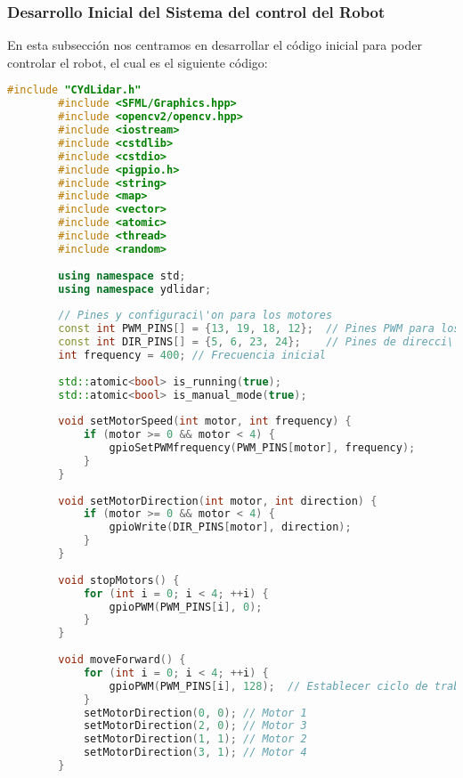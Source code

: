 \subsubsection{Desarrollo Inicial del Sistema del control del Robot}
\label{sub:Desarrollo Inicial del Sistema del control del Robot}
    En esta subsecci\'on nos centramos en desarrollar el c\'odigo inicial para poder controlar el robot, el cual es el siguiente c\'odigo:
    \vskip 0.5cm
    \begin{lstlisting}[language={C++}, caption={Primera versi\'on del c\'odigo del sistema de control del robot}, label={Script}]
        #include "CYdLidar.h"
        #include <SFML/Graphics.hpp>
        #include <opencv2/opencv.hpp>
        #include <iostream>
        #include <cstdlib>
        #include <cstdio>
        #include <pigpio.h>
        #include <string>
        #include <map>
        #include <vector>
        #include <atomic>
        #include <thread>
        #include <random>
        
        using namespace std;
        using namespace ydlidar;
        
        // Pines y configuraci\'on para los motores
        const int PWM_PINS[] = {13, 19, 18, 12};  // Pines PWM para los motores
        const int DIR_PINS[] = {5, 6, 23, 24};    // Pines de direcci\'on para los motores
        int frequency = 400; // Frecuencia inicial
        
        std::atomic<bool> is_running(true);
        std::atomic<bool> is_manual_mode(true);
        
        void setMotorSpeed(int motor, int frequency) {
            if (motor >= 0 && motor < 4) {
                gpioSetPWMfrequency(PWM_PINS[motor], frequency);
            }
        }
        
        void setMotorDirection(int motor, int direction) {
            if (motor >= 0 && motor < 4) {
                gpioWrite(DIR_PINS[motor], direction);
            }
        }
        
        void stopMotors() {
            for (int i = 0; i < 4; ++i) {
                gpioPWM(PWM_PINS[i], 0);
            }
        }
        
        void moveForward() {
            for (int i = 0; i < 4; ++i) {
                gpioPWM(PWM_PINS[i], 128);  // Establecer ciclo de trabajo al 50%
            }
            setMotorDirection(0, 0); // Motor 1
            setMotorDirection(2, 0); // Motor 3
            setMotorDirection(1, 1); // Motor 2
            setMotorDirection(3, 1); // Motor 4
        }
        

\end{lstlisting}
